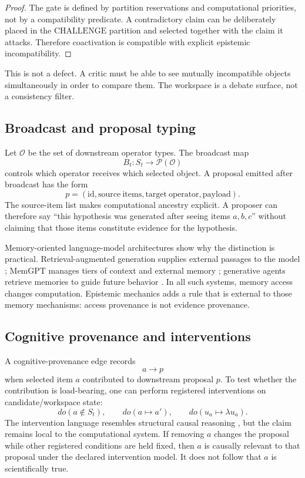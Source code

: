 \documentclass[11pt]{article}
\newcommand{\powerset}{\mathcal P}
\begin{document}
\begin{proof}
The gate is defined by partition reservations and computational priorities, not by a compatibility predicate. A contradictory claim can be deliberately placed in the \(\mathrm{CHALLENGE}\) partition and selected together with the claim it attacks. Therefore coactivation is compatible with explicit epistemic incompatibility.
\end{proof}

This is not a defect. A critic must be able to see mutually incompatible objects simultaneously in order to compare them. The workspace is a debate surface, not a consistency filter.

\subsection{Broadcast and proposal typing}

Let \(\mathcal O\) be the set of downstream operator types. The broadcast map
\[
B_t:S_t\longrightarrow\powerset(\mathcal O)
\]
controls which operator receives which selected object. A proposal emitted after broadcast has the form
\[
p=(\mathrm{id},\mathrm{source\ items},\mathrm{target\ operator},\mathrm{payload}).
\]
The source-item list makes computational ancestry explicit. A proposer can therefore say ``this hypothesis was generated after seeing items \(a,b,c\)'' without claiming that those items constitute evidence for the hypothesis.

Memory-oriented language-model architectures show why the distinction is practical. Retrieval-augmented generation supplies external passages to the model \cite{lewis2020}; MemGPT manages tiers of context and external memory \cite{packer2023}; generative agents retrieve memories to guide future behavior \cite{park2023}. In all such systems, memory access changes computation. Epistemic mechanics adds a rule that is external to those memory mechanisms: access provenance is not evidence provenance.

\subsection{Cognitive provenance and interventions}

A cognitive-provenance edge records
\[
a\longrightarrow p
\]
when selected item \(a\) contributed to downstream proposal \(p\). To test whether the contribution is load-bearing, one can perform registered interventions on candidate/workspace state:
\[
do(a\notin S_t),\qquad do(a\mapsto a'),\qquad do(u_a\mapsto\lambda u_a).
\]
The intervention language resembles structural causal reasoning \cite{pearl2009,halpern2016}, but the claim remains local to the computational system. If removing \(a\) changes the proposal while other registered conditions are held fixed, then \(a\) is causally relevant to that proposal under the declared intervention model. It does not follow that \(a\) is scientifically true.
\end{document}
